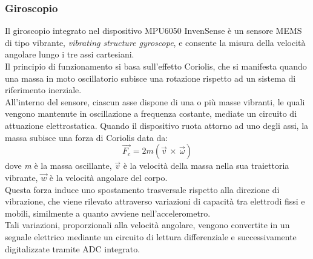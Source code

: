 \documentclass[11pt]{report}
\begin{document}
\subsubsection{Giroscopio}
Il giroscopio integrato nel dispositivo MPU6050 InvenSense è un sensore MEMS di tipo vibrante, \textit{vibrating structure gyroscope}, e consente la misura della velocità angolare lungo i tre assi cartesiani.\\
Il principio di funzionamento si basa sull'effetto Coriolis, che si manifesta quando una massa in moto oscillatorio subisce una rotazione rispetto ad un sistema di riferimento inerziale.\\
All'interno del sensore, ciascun asse dispone di una o più masse vibranti, le quali vengono mantenute in oscillazione a frequenza costante, mediate un circuito di attuazione elettrostatica. Quando il dispositivo ruota attorno ad uno 
degli assi, la massa subisce una forza di Coriolis data da:
\begin{equation}
    \vec{F_c} = 2m(\vec{v}\,\times \,\vec\omega )
\end{equation}
dove \textit{m} è la massa oscillante, $\vec{v}$ è la velocità della massa nella sua traiettoria vibrante, $\vec{w}$ è la velocità angolare del corpo.\\
Questa forza induce uno spostamento trasversale rispetto alla direzione di vibrazione, che viene rilevato attraverso variazioni di capacità tra elettrodi fissi e mobili, similmente a quanto avviene nell'accelerometro.\\
Tali variazioni, proporzionali alla velocità angolare, vengono convertite in un segnale elettrico mediante un circuito di lettura differenziale e successivamente digitalizzate tramite ADC integrato.
\end{document}
